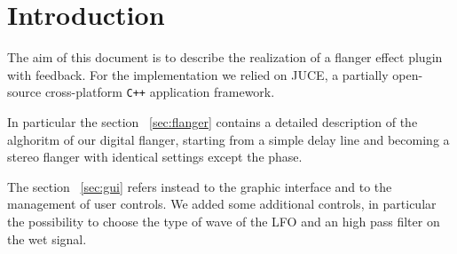 \section{Introduction}

The aim of this document is to describe the realization of a flanger effect plugin with feedback. For the implementation we relied on JUCE, a partially open-source cross-platform \texttt{C++} application framework.

In particular the section ~\ref{sec:flanger} contains a detailed description of the alghoritm of our digital flanger, starting from a simple delay line and becoming a stereo flanger with identical settings except the phase.

The section ~\ref{sec:gui} refers instead to the graphic interface and to the management of user controls. We added some additional controls, in particular the possibility to choose the type of wave of the LFO and an high pass filter on the wet signal.